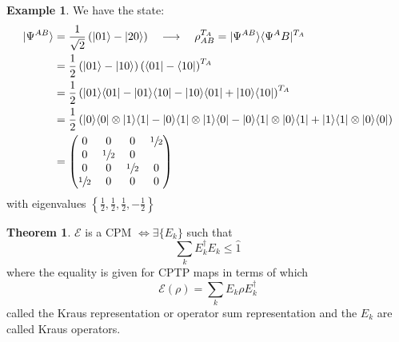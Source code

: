 \documentclass[12pt]{book}
\theoremstyle{definition}
\newtheorem*{theo}{\bfseries Theorem}
\newtheorem*{example}{\bfseries Example}
\let\oldsum\sum
\renewcommand{\sum}[2]{\oldsum\limits_{#1}^{#2}}
\renewcommand{\to}{\longrightarrow}
\newcommand{\para}[1]{\left( {#1} \right)}
\newcommand{\bra}[1]{\langle {#1} \vert}
\newcommand{\ket}[1]{\vert {#1} \rangle}
\begin{document}
\begin{example}
We have the state:
\begin{align*}
  \ket{\Psi^{AB}} & = \frac{1}{\sqrt{2}} \para{\ket{01} - \ket{20}} \quad\to\quad \rho_{AB}^{T_A} = \ket{\Psi^{AB}} \bra{\Psi^AB}^{T_A} \\
  & = \frac{1}{2} \para{\ket{01} - \ket{10}}\para{\bra{01} - \bra{10}}^{T_A} \\
  & = \frac{1}{2} \para{\ket{01}\bra{01} - \ket{01}\bra{10} - \ket{10}\bra{01} + \ket{10}\bra{10}}^{T_A} \\
  & = \frac{1}{2} \para{\ket{0}\bra{0} \otimes \ket{1}\bra{1} - \ket{0}\bra{1} \otimes \ket{1} \bra{0} - \ket{0} \bra{1} \otimes \ket{0} \bra{1} + \ket{1}\bra{1} \otimes\ket{0} \bra{0}} \\
  & =
  \begin{pmatrix}
    0 & 0 & 0 & \sfrac{1}{2} \\
    0 & \sfrac{1}{2} & 0 & \\
    0 & 0 & \sfrac{1}{2} & 0 \\
    \sfrac{1}{2} & 0 & 0 & 0
  \end{pmatrix}
\end{align*}
with eigenvalues $\left\{\frac{1}{2}, \frac{1}{2}, \frac{1}{2}, -\frac{1}{2}\right\}$
\end{example}


\begin{theo}
    $\mathcal E$ is a CPM $\iff \exists \{E_k\}$ such that
    \begin{equation}
      \oldsum_k E_k^\dagger E_k \leq \hat 1
    \end{equation}
    where the equality is given for CPTP maps in terms of which
    \begin{equation}
      \mathcal E(\rho) = \oldsum_k E_k \rho E_k^\dagger
    \end{equation}
    called the Kraus representation or operator sum representation and the $E_k$ are called Kraus operators.
\end{theo}
\end{document}
